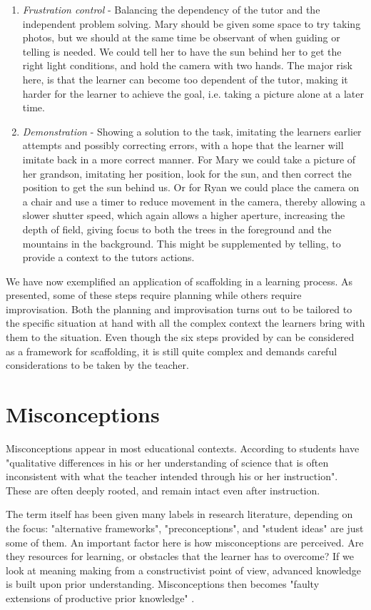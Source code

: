 \begin{enumerate}
\item{} \emph{Frustration control} - Balancing the dependency of the tutor and the independent problem solving. Mary should be given some space to try taking photos, but we should at the same time be observant of when guiding or telling is needed. We could tell her to have the sun behind her to get the right light conditions, and hold the camera with two hands. The major risk here, is that the learner can become too dependent of the tutor, making it harder for the learner to achieve the goal, i.e. taking a picture alone at a later time.  
\item{}  \emph{Demonstration} - Showing a solution to the task, imitating the learners earlier attempts and possibly correcting errors, with a hope that the learner will imitate back in a more correct manner. For Mary we could take a picture of her grandson, imitating her position, look for the sun, and then correct the position to get the sun behind us. Or for Ryan we could place the camera on a chair and use a timer to reduce movement in the camera, thereby allowing a slower shutter speed, which again allows a higher aperture, increasing the depth of field, giving focus to both the trees in the foreground and the mountains in the background. This might be supplemented by telling, to provide a context to the tutors actions.
\end{enumerate}

We have now exemplified an application of scaffolding in a learning process. As presented, some of these steps require planning while others require improvisation. Both the planning and improvisation turns out to be tailored to the specific situation at hand with all the complex context the learners bring with them to the situation. Even though the six steps provided by \citet{wood1976role} can be considered as a framework for scaffolding, it is still quite complex and demands careful considerations to be taken by the teacher.  

\section{Misconceptions}
Misconceptions appear in most educational contexts. According to \citet{gomez2008elementary} students have "qualitative differences in his or her understanding of science that is often inconsistent with what the teacher intended through his or her instruction". These are often deeply rooted, and remain intact even after instruction. 

The term itself has been given many labels in research literature, depending on the focus: "alternative frameworks", "preconceptions", and "student ideas" are just some of them. An important factor here is how misconceptions are perceived. Are they resources for learning, or obstacles that the learner has to overcome? If we look at meaning making from a constructivist point of view, advanced knowledge is built upon prior understanding. Misconceptions then becomes "faulty extensions of productive prior knowledge" \citep{smith1994misconceptions}.

